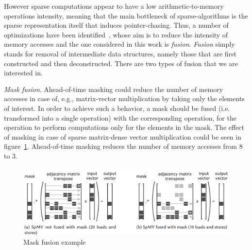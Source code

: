 \documentclass[acmsmall,review,nonacm]{acmart}\settopmatter{printfolios=true,printccs=false,printacmref=false}
\begin{document}
However sparse computations appear to have a low arithmetic-to-memory operations intensity, meaning that the main bottleneck of sparse-algorithms is the sparse representation itself that induces pointer-chasing. Thus, a number of optimizations have been identified~\cite{yang2020graphblast}, whose aim is to reduce the intensity of memory accesses and the one considered in this work is \emph{fusion}. \emph{Fusion} simply stands for removal of intermediate data structures, namely those that are first constructed and then deconstructed. There are two types of fusion that we are interested in.

\emph{Mask fusion}. Ahead-of-time masking could reduce the number of memory accesses in case of, e.g., matrix-vector multiplication by taking only the elements of interest.
In order to achieve such a behavior, a mask should be fused (i.e. transformed into a single operation) with the corresponding operation, for the operation to perform computations only for the elements in the mask. The effect of masking in case of sparse matrix-dense vector multiplication could be seen in figure~\ref{fig:fusion}. Ahead-of-time masking reduces the number of memory accesses from 8 to 3.

\begin{figure}
    \centering
    \includegraphics[width=0.75\linewidth]{figures/MaskFusion.png}
    \caption{Mask fusion example~\cite{yang2020graphblast}}
    \label{fig:fusion}
\end{figure}
\end{document}

